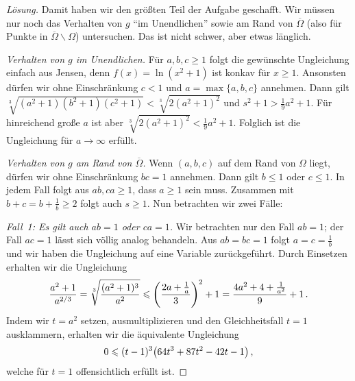 \begin{proof}[Lösung]
	Damit haben wir den größten Teil der Aufgabe geschafft. Wir müssen nur noch das Verhalten von $g$ \enquote{im Unendlichen} sowie am Rand von $\overline{\Omega}$ (also für Punkte in $\overline{\Omega}\smallsetminus \Omega$) untersuchen. Das ist nicht schwer, aber etwas länglich.
	
	\emph{Verhalten von $g$ im Unendlichen.} Für $a,b,c\geqslant 1$ folgt die gewünschte Ungleichung einfach aus Jensen, denn $f(x)=\ln(x^2+1)$ ist konkav für $x\geqslant 1$. Ansonsten dürfen wir ohne Einschränkung $c<1$ und $a=\max\{a,b,c\}$ annehmen. Dann gilt $\sqrt[3]{(a^2+1)(b^2+1)(c^2+1)}<\sqrt[3]{2(a^2+1)^2}$ und $s^2+1> \frac19a^2+1$. Für hinreichend große $a$ ist aber $\sqrt[3]{2(a^2+1)^2}<\frac19a^2+1$. Folglich ist die Ungleichung für $a\rightarrow \infty$ erfüllt.
	
	\emph{Verhalten von $g$ am Rand von $\overline{\Omega}$.} Wenn $(a,b,c)$ auf dem Rand von $\Omega$ liegt, dürfen wir ohne Einschränkung $bc=1$ annehmen. Dann gilt $b\leqslant 1$ oder $c\leqslant 1$. In jedem Fall folgt aus $ab,ca\geqslant 1$, dass $a\geqslant 1$ sein muss. Zusammen mit $b+c=b+\frac1b\geqslant 2$ folgt auch $s\geqslant 1$. Nun betrachten wir zwei Fälle:
	
	\emph{Fall~1: Es gilt auch $ab=1$ oder $ca=1$.} Wir betrachten nur den Fall $ab=1$; der Fall $ac=1$ lässt sich völlig analog behandeln. Aus $ab=bc=1$ folgt $a=c=\frac1b$ und wir haben die Ungleichung auf eine Variable zurückgeführt. Durch Einsetzen erhalten wir die Ungleichung
	\begin{equation*}
		\frac{a^2+1}{a^{2/3}}=\sqrt[3]{\frac{(a^2+1)^3}{a^2}}\leqslant \parens*{\frac{2a+\frac1a}{3}}^2+1=\frac{4a^2+4+\frac1{a^2}}{9}+1\,.
	\end{equation*}
	Indem wir $t=a^2$ setzen, ausmultiplizieren und den Gleichheitsfall $t=1$ ausklammern, erhalten wir die äquivalente Ungleichung
	\begin{equation*}
		0\leqslant (t-1)^3\parens*{64t^3+87t^2-42t-1}\,,
	\end{equation*}
	welche für $t=1$ offensichtlich erfüllt ist.
	

\end{proof}

